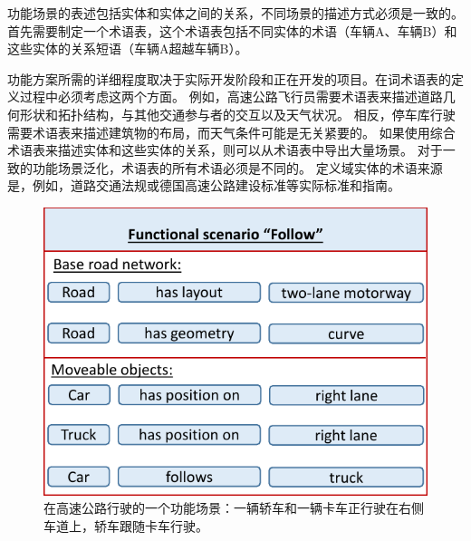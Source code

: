 功能场景的表述包括实体和实体之间的关系，不同场景的描述方式必须是一致的。首先需要制定一个术语表，这个术语表包括不同实体的术语（车辆A、车辆B）和这些实体的关系短语（车辆A超越车辆B）。 

功能方案所需的详细程度取决于实际开发阶段和正在开发的项目。在词术语表的定义过程中必须考虑这两个方面。
例如，高速公路飞行员需要术语表来描述道路几何形状和拓扑结构，与其他交通参与者的交互以及天气状况。
相反，停车库行驶需要术语表来描述建筑物的布局，而天气条件可能是无关紧要的。
如果使用综合术语表来描述实体和这些实体的关系，则可以从术语表中导出大量场景。
对于一致的功能场景泛化，术语表的所有术语必须是不同的。
定义域实体的术语来源是，例如，道路交通法规或德国高速公路建设标准等实际标准和指南\cite{RAA}。

\begin{figure}
	\centering
	\includegraphics[width=0.9\columnwidth]{./4_terminology/graphics/functionalScenario.pdf}
	\caption{在高速公路行驶的一个功能场景：一辆轿车和一辆卡车正行驶在右侧车道上，轿车跟随卡车行驶。}
	\label{fig:functionalScenario}
\end{figure}

